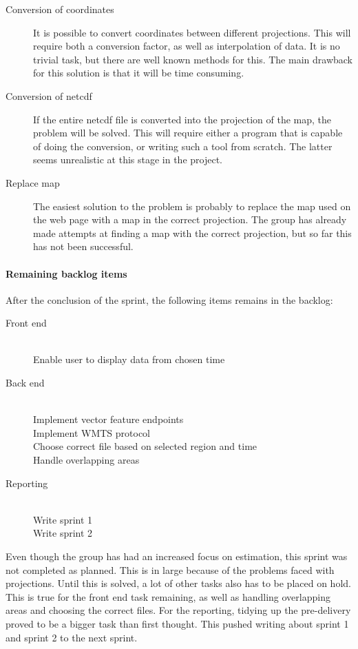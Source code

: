 \documentclass[11pt,a4paper,titlepage,oneside]{report}
\begin{document}
\begin{description}
\item[Conversion of coordinates] It is possible to convert coordinates between different projections. This will require both a conversion factor, as well as interpolation of data. It is no trivial task, but there are well known methods for this. The main drawback for this solution is that it will be time consuming. 
\item[Conversion of \gls{netcdf}] If the entire \gls{netcdf} file is converted into the projection of the map, the problem will be solved. This will require either a program that is capable of doing the conversion, or writing such a tool from scratch. The latter seems unrealistic at this stage in the project.
\item[Replace map] The easiest solution to the problem is probably to replace the map used on the web page with a map in the correct projection. The group has already made attempts at finding a map with the correct projection, but so far this has not been successful.
\end{description}

\paragraph{Remaining backlog items}
After the conclusion of the sprint, the following items remains in the backlog:
\begin{description}
	\item[Front end] \hfill \\
	Enable user to display data from chosen time
	\item[Back end] \hfill \\
	Implement vector feature endpoints \hfill \\
	Implement WMTS protocol \hfill \\
	Choose correct file based on selected region and time \hfill \\
	Handle overlapping areas 
	\item[Reporting] \hfill \\
	Write sprint 1 \hfill \\
	Write sprint 2
\end{description}

Even though the group has had an increased focus on estimation, this sprint was not completed as planned. This is in large because of the problems faced with projections. Until this is solved, a lot of other tasks also has to be placed on hold. This is true for the front end task remaining, as well as handling overlapping areas and choosing the correct files. For the reporting, tidying up the pre-delivery proved to be a bigger task than first thought. This pushed writing about sprint 1 and sprint 2 to the next sprint.  
\end{document}
